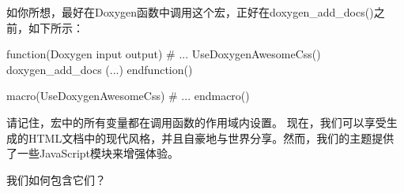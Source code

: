 如你所想，最好在Doxygen函数中调用这个宏，正好在doxygen\_add\_docs()之前，如下所示：


\begin{cmake}
function(Doxygen input output)
# ...
UseDoxygenAwesomeCss()
doxygen_add_docs (...)
endfunction()

macro(UseDoxygenAwesomeCss)
# ...
endmacro()
\end{cmake}

请记住，宏中的所有变量都在调用函数的作用域内设置。 现在，我们可以享受生成的HTML文档中的现代风格，并且自豪地与世界分享。然而，我们的主题提供了一些JavaScript模块来增强体验。

我们如何包含它们？









































































